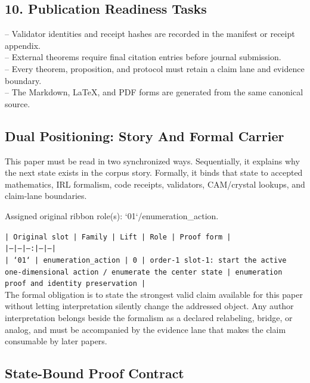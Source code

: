 \documentclass[11pt]{article}
\begin{document}
\subsection*{10. Publication Readiness Tasks}

\noindent{}-- Validator identities and receipt hashes are recorded in the manifest or receipt appendix.\\
\noindent{}-- External theorems require final citation entries before journal submission.\\
\noindent{}-- Every theorem, proposition, and protocol must retain a claim lane and evidence boundary.\\
\noindent{}-- The Markdown, LaTeX, and PDF forms are generated from the same canonical source.\\

\subsection*{Dual Positioning: Story And Formal Carrier}

This paper must be read in two synchronized ways. Sequentially, it explains why
the next state exists in the corpus story. Formally, it binds that state to
accepted mathematics, IRL formalism, code receipts, validators, CAM/crystal
lookups, and claim-lane boundaries.

Assigned original ribbon role(s): `01`/enumeration\_action.

\noindent\texttt{| Original slot | Family | Lift | Role | Proof form |}\\
\noindent\texttt{|---|---|---:|---|---|}\\
\noindent\texttt{| `01` | enumeration\_action | 0 | order-1 slot-1: start the active one-dimensional action / enumerate the center state | enumeration proof and identity preservation |}\\

The formal obligation is to state the strongest valid claim available for this
paper without letting interpretation silently change the addressed object. Any
author interpretation belongs beside the formalism as a declared relabeling,
bridge, or analog, and must be accompanied by the evidence lane that makes the
claim consumable by later papers.

\subsection*{State-Bound Proof Contract}
\end{document}
